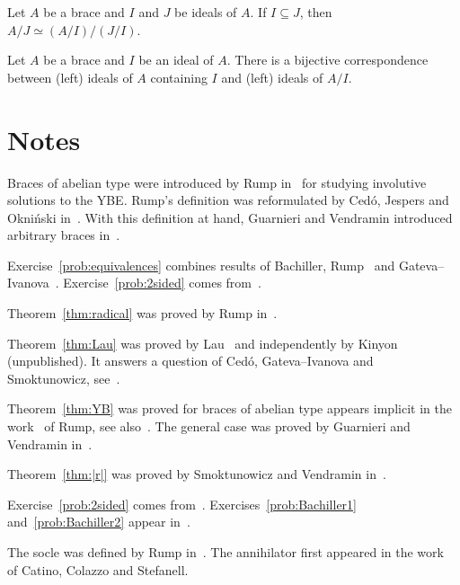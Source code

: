 \begin{prob}
\label{prob:iso3}
Let $A$ be a brace and $I$ and $J$ be ideals of $A$. If $I\subseteq J$, then
$A/J\simeq (A/I)/(J/I)$. 
\end{prob}

\begin{prob}
\label{prob:correspondence}
Let $A$ be a brace and $I$ be an ideal of $A$. There is a bijective correspondence between (left) ideals 
of $A$ containing $I$ and (left) ideals of $A/I$. 
\end{prob}
\section*{Notes}

Braces of abelian type were introduced by Rump in~\cite{MR2278047} for studying involutive
solutions to the YBE. 
Rump's definition was reformulated  
by Ced\'o, Jespers and Okni\'nski in~\cite{MR3177933}. With this definition at hand, 
Guarnieri and Vendramin introduced 
arbitrary braces in~\cite{MR3647970}. 

Exercise~\ref{prob:equivalences} combines results of Bachiller, Rump~\cite{MR2278047} and
Gateva--Ivanova~\cite{MR3861714}. Exercise~\ref{prob:2sided} comes from~\cite{MR3177933}. 

Theorem~\ref{thm:radical} was proved by Rump in~\cite{MR2278047}. 

Theorem~\ref{thm:Lau} was proved by Lau~\cite{MR4136750} and independently by Kinyon (unpublished). It answers 
a question of Ced\'o, Gateva--Ivanova and Smoktunowicz, see~\cite{MR3818285}. 

Theorem~\ref{thm:YB} was proved for braces of abelian type appears implicit in the work~\cite{MR2278047} of Rump, see
also~\cite{MR3177933}. The general case was proved by Guarnieri and Vendramin in~\cite{MR3647970}. 

Theorem~\ref{thm:|r|} was proved by Smoktunowicz and Vendramin in~\cite{MR3763907}. 

Exercise~\ref{prob:2sided} comes from~\cite{MR3177933}. 
Exercises~\ref{prob:Bachiller1} and~\ref{prob:Bachiller2} appear in~\cite{MR3835326}.

The socle was defined by Rump in~\cite{MR2278047}. The annihilator first appeared in the work~\cite{MR3917122}  
of Catino, Colazzo and Stefanell. 
